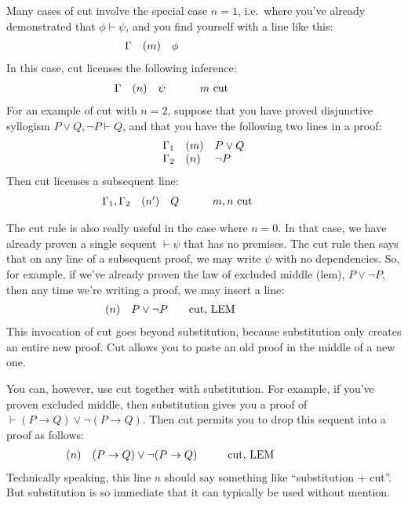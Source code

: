 Many cases of cut involve the special case $n=1$, i.e.\ where you've
already demonstrated that $\phi\vdash\psi$, and you find yourself with
a line like this:
\[ \begin{array}{l l l p{3cm}}
     \Gamma & (m) & \phi  & \end{array} \]
In this case, cut licenses the following inference:
 \[ \begin{array}{l l >{$}p{1cm}<{$} p{3cm}}
      \Gamma & (n) & \psi & $m$ cut \end{array} \]
For an example of cut with $n=2$, suppose that you have proved
disjunctive syllogism $P\vee Q,\neg P\vdash Q$, and that you have the
following two lines in a proof:
\[ \begin{array}{r l l p{3cm}}
     \Gamma _1 & (m) & P\vee Q \\
     \Gamma _2 & (n) & \neg P  \end{array} \]
 Then cut licenses a subsequent line:
 \[ \begin{array}{r l >{$}p{1cm}<{$} p{3cm}}
      \Gamma _1,\Gamma _2 & (n') & Q & $m,n$ cut \end{array} \]

  The cut rule is also really useful in the case where $n=0$.  In that
  case, we have already proven a single sequent $\vdash\psi$ that has
  no premises.  The cut rule then says that on any line of a
  subsequent proof, we may write $\psi$ with no dependencies.  So, for
  example, if we've already proven the law of excluded middle (lem),
  $P\vee\neg P$, then any time we're writing a proof, we may insert a
  line:
 \[ \begin{array}{l c >{$}p{1.5cm}<{$} p{4cm}}
  & (n) & P\vee\neg P & cut, LEM \end{array} \]
This invocation of cut goes beyond substitution, because substitution
only creates an entire new proof.  Cut allows you to paste an old
proof in the middle of a new one.

You can, however, use cut together with substitution.  For example, if
you've proven excluded middle, then substitution gives you a proof of
$\vdash (P\to Q)\vee \neg (P\to Q)$.  Then cut permits you to drop
this sequent into a proof as follows:
 \[ \begin{array}{l c >{$}p{4cm}<{$} p{4cm}}
  & (n) & (P\to Q)\vee\neg (P\to Q) & cut, LEM \end{array} \]
Technically speaking, this line $n$ should say something like
``substitution + cut''.  But substitution is so immediate that it can
typically be used without mention.

